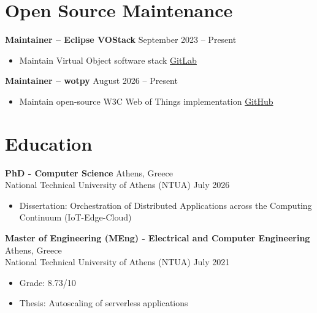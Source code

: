 \documentclass[11pt]{article}       %
\begin{document}
\vspace{-18.5pt}

\section*{Open Source Maintenance}

\textbf{Maintainer -- Eclipse VOStack} \hfill September 2023 -- Present \\
\vspace{-9pt}
\begin{itemize}
  \item Maintain Virtual Object software stack \hfill \href{https://gitlab.eclipse.org/eclipse/vostack/vostack}{GitLab}
\end{itemize}

\textbf{Maintainer -- wotpy} \hfill August 2026 -- Present \\
\vspace{-9pt}
\begin{itemize}
  \item Maintain open-source W3C Web of Things implementation \hfill \href{https://github.com/eclipse-thingweb/wotpy}{GitHub}
\end{itemize}

\vspace{-19pt}

\section*{Education}
\textbf{PhD - Computer Science} \hfill Athens, Greece \\
National Technical University of Athens (NTUA) \hfill July 2026 \\
\vspace{-9pt}
\begin{itemize}
  \item Dissertation: Orchestration of Distributed Applications across the Computing Continuum (IoT-Edge-Cloud)
\end{itemize}

\textbf{Master of Engineering (MEng) - Electrical and Computer Engineering} \hfill Athens, Greece \\
National Technical University of Athens (NTUA) \hfill July 2021 \\
\vspace{-9pt}
\begin{itemize}
  \item Grade: 8.73/10
  \item Thesis: Autoscaling of serverless applications
\end{itemize}
\end{document}
